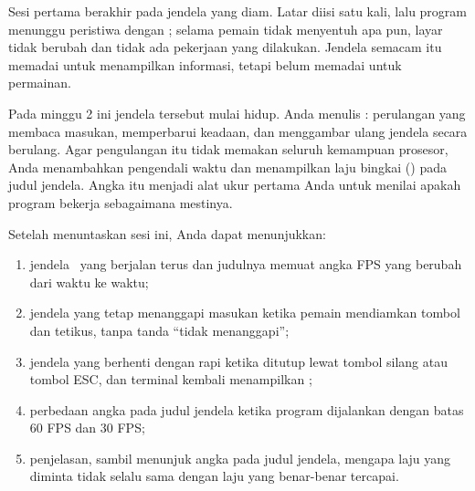 

Sesi pertama berakhir pada jendela yang diam. Latar diisi satu kali, lalu
program menunggu peristiwa dengan ; selama pemain
tidak menyentuh apa pun, layar tidak berubah dan tidak ada pekerjaan yang
dilakukan. Jendela semacam itu memadai untuk menampilkan informasi, tetapi
belum memadai untuk permainan.

Pada minggu 2 ini jendela tersebut mulai hidup. Anda menulis : perulangan yang membaca masukan, memperbarui keadaan, dan menggambar
ulang jendela secara berulang. Agar pengulangan itu tidak memakan seluruh
kemampuan prosesor, Anda menambahkan pengendali waktu dan menampilkan laju
bingkai () pada judul jendela. Angka itu menjadi alat ukur pertama
Anda untuk menilai apakah program bekerja sebagaimana mestinya.


\begin{tujuanbox}
Setelah menuntaskan sesi ini, Anda dapat menunjukkan:
\begin{enumerate}[leftmargin=1.5em, itemsep=0.2em]
  \item jendela \NamaPermainan\ yang berjalan terus dan judulnya memuat angka
        FPS yang berubah dari waktu ke waktu;
  \item jendela yang tetap menanggapi masukan ketika pemain mendiamkan tombol
        dan tetikus, tanpa tanda ``tidak menanggapi'';
  \item jendela yang berhenti dengan rapi ketika ditutup lewat tombol silang
        atau tombol ESC, dan terminal kembali menampilkan
        ;
  \item perbedaan angka pada judul jendela ketika program dijalankan dengan
        batas 60 FPS dan 30 FPS;
  \item penjelasan, sambil menunjuk angka pada judul jendela, mengapa laju
        yang diminta tidak selalu sama dengan laju yang benar-benar tercapai.
\end{enumerate}
\end{tujuanbox}


